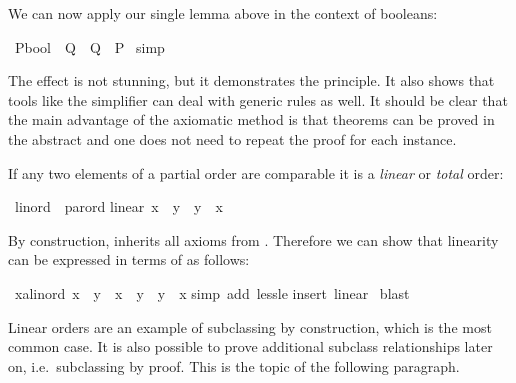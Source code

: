 \begin{isabellebody}
\begin{isamarkuptext}
We can now apply our single lemma above in the context of booleans:%
\end{isamarkuptext}%
\ {\isachardoublequote}{\isacharparenleft}P{\isacharcolon}{\isacharcolon}bool{\isacharparenright}\ {\isacharless}{\isacharless}\ Q\ {\isasymLongrightarrow}\ {\isasymnot}{\isacharparenleft}Q\ {\isacharless}{\isacharless}\ P{\isacharparenright}{\isachardoublequote}\isanewline
{}\ simp%
\begin{isamarkuptext}%
\noindent
The effect is not stunning, but it demonstrates the principle.  It also shows
that tools like the simplifier can deal with generic rules as well.
It should be clear that the main advantage of the axiomatic method is that
theorems can be proved in the abstract and one does not need to repeat the
proof for each instance.%
\end{isamarkuptext}%
%
%
\begin{isamarkuptext}%
If any two elements of a partial order are comparable it is a
\emph{linear} or \emph{total} order:%
\end{isamarkuptext}%
\ linord\ {\isacharless}\ parord\isanewline
linear{\isacharcolon}\ {\isachardoublequote}x\ {\isacharless}{\isacharless}{\isacharequal}\ y\ {\isasymor}\ y\ {\isacharless}{\isacharless}{\isacharequal}\ x{\isachardoublequote}%
\begin{isamarkuptext}%
\noindent
By construction,  inherits all axioms from .
Therefore we can show that linearity can be expressed in terms of \isa{{\isacharless}{\isacharless}}
as follows:%
\end{isamarkuptext}%
\ {\isachardoublequote}{\isasymAnd}x{\isacharcolon}{\isacharcolon}{\isacharprime}a{\isacharcolon}{\isacharcolon}linord{\isachardot}\ x\ {\isacharless}{\isacharless}\ y\ {\isasymor}\ x\ {\isacharequal}\ y\ {\isasymor}\ y\ {\isacharless}{\isacharless}\ x{\isachardoublequote}\isanewline
{}simp\ add{\isacharcolon}\ less{\isacharunderscore}le{\isacharparenright}\isanewline
{}insert\ linear{\isacharparenright}\isanewline
{}\ blast\isanewline
{}%
\begin{isamarkuptext}%
Linear orders are an example of subclassing by construction, which is the most
common case. It is also possible to prove additional subclass relationships
later on, i.e.\ subclassing by proof. This is the topic of the following
paragraph.%
\end{isamarkuptext}%

\end{isabellebody}
